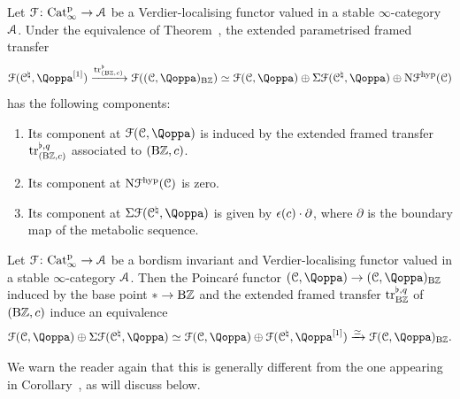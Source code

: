 \begin{proposition}
\label{proposition:geometric}%
Let $\mathcal{F}\colon \mathrm{Cat}^{\mathrm p}_\infty \to \mathcal{A}$ be a Verdier-localising functor valued in a stable $\infty$-category $\mathcal{A}$. Under the equivalence of Theorem~, the extended parametrised framed transfer
\[
\F(\C^\natural,\QF\qshift{1}) \xrightarrow{\tr^{\flat}_{(\B\ZZ,c)}} \F((\C, \QF)_{\B\ZZ})\simeq \F(\C,\QF) \oplus \Sig\F(\C^\natural,\QF) \oplus \N\F^{\hyp}(\C)
\]
has the following components:
\begin{enumerate}
\item
\label{item:base-component}%
Its component at $\F(\C,\QF)$ is induced by the extended framed transfer $\mathrm{tr}_{(\mathrm{B}\mathbb{Z},c)}^{\flat,q}$ associated to $(\mathrm{B}\mathbb{Z},c)$.
\item
\label{item:nil-component}%
Its component at $\mathrm{N}\mathcal{F}^{\mathrm{hyp}}(\mathcal C)$ is zero.
\item
\label{item:sig-component}%
Its component at $\Sig\F(\C^\natural,\QF)$ is given by $\epsilon(c)\cdot \partial$, where $\partial$ is the boundary map of the metabolic sequence. 
\end{enumerate}
\end{proposition}



\begin{corollary}%
\label{corollary:geometric-shaneson-splitting}%
Let $\mathcal{F}\colon \mathrm{Cat}^{\mathrm p}_\infty \to \mathcal{A}$ be a bordism invariant and Verdier-localising functor valued in a stable $\infty$-category $\mathcal{A}$. 
Then the Poincaré functor $(\C,\QF) \to (\C,\QF)_{\B\ZZ}$ induced by 
the base point $\ast \to \mathrm{B}\mathbb{Z}$ and the extended framed transfer $\mathrm{tr}_{\mathrm{B}\mathbb{Z}}^{\flat,q}$ of $(\mathrm{B}\mathbb{Z},c)$ induce an equivalence
\[
\F(\C,\QF) \oplus \Sig\F(\C^\natural,\QF) \simeq \F(\C,\QF) \oplus \F(\C^\natural,\QF\qshift{1}) \xrightarrow{\simeq} \F(\C,\QF)_{\B\ZZ} .
\]
\end{corollary}

We warn the reader again that this  is generally different from the one appearing in Corollary~, as will discuss below.

